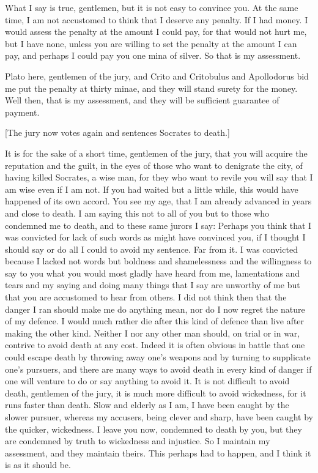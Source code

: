 What I say is true, gentlemen, but it is not easy to convince you. At the same time, I am not
accustomed to think that I deserve any penalty. If I had money. I would assess the penalty at the
amount I could pay, for that would not hurt me, but I have none, unless you are willing to set the
penalty at the amount I can pay, and perhaps I could pay you one mina of silver. So that is my
assessment.

Plato here, gentlemen of the jury, and Crito and Critobulus and Apollodorus bid me put the
penalty at thirty minae, and they will stand surety for the money. Well then, that is my assessment,
and they will be sufficient guarantee of payment.

[The jury now votes again and sentences Socrates to death.]

It is for the sake of a short time, gentlemen of the jury, that you will acquire the reputation and
the guilt, in the eyes of those who want to denigrate the city, of having killed Socrates, a wise man,
for they who want to revile you will say that I am wise even if I am not. If you had waited but a
little while, this would have happened of its own accord. You see my age, that I am already
advanced in years and close to death. I am saying this not to all of you but to those who
condemned me to death, and to these same jurors I say: Perhaps you think that I was convicted for
lack of such words as might have convinced you, if I thought I should say or do all I could to avoid
my sentence. Far from it. I was convicted because I lacked not words but boldness and
shamelessness and the willingness to say to you what you would most gladly have heard from me,
lamentations and tears and my saying and doing many things that I say are unworthy of me but that
you are accustomed to hear from others. I did not think then that the danger I ran should make me
do anything mean, nor do I now regret the nature of my defence. I would much rather die after this
kind of defence than live after making the other kind. Neither I nor any other man should, on trial
or in war, contrive to avoid death at any cost. Indeed it is often obvious in battle that one could
escape death by throwing away one's weapons and by turning to supplicate one's pursuers, and
there are many ways to avoid death in every kind of danger if one will venture to do or say
anything to avoid it. It is not difficult to avoid death, gentlemen of the jury, it is much more
difficult to avoid wickedness, for it runs faster than death. Slow and elderly as I am, I have been
caught by the slower pursuer, whereas my accusers, being clever and sharp, have been caught by
the quicker, wickedness. I leave you now, condemned to death by you, but they are condemned
by truth to wickedness and injustice. So I maintain my assessment, and they maintain theirs. This
perhaps had to happen, and I think it is as it should be.

